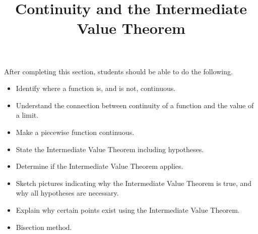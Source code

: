\documentclass{ximera}
\title{Continuity and the Intermediate Value Theorem}
\begin{document}
\begin{abstract}
\end{abstract}

\maketitle

\begin{sectionOutcomes}
After completing this section, students should be able to do the following.

\begin{itemize}
\item Identify where a function is, and is not, continuous.
\item Understand the connection between continuity of a function and
  the value of a limit.
\item Make a piecewise function continuous.
\item State the Intermediate Value Theorem including hypotheses.
\item Determine if the Intermediate Value Theorem applies.
\item Sketch pictures indicating why the Intermediate Value Theorem is
  true, and why all hypotheses are necessary.
\item Explain why certain points exist using the Intermediate Value
  Theorem.
\item Bisection method.
\end{itemize}

\end{sectionOutcomes}
\end{document}
